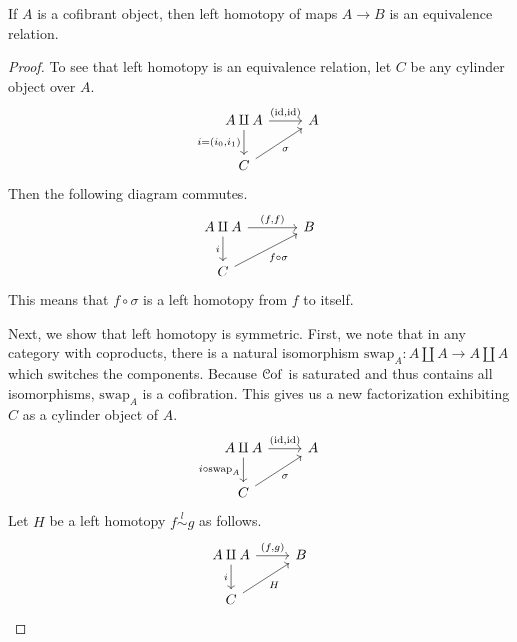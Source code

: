 \documentclass[main.tex]{subfiles}
\begin{document}
\begin{proposition}
  \label{prop:left_homotopy_is_equivalence_relation}
  If $A$ is a cofibrant object, then left homotopy of maps $A \to B$ is an equivalence relation.
\end{proposition}
\begin{proof}
  To see that left homotopy is an equivalence relation, let $C$ be any cylinder object over $A$.
  \begin{equation*}
    \begin{tikzcd}
      A \amalg A
      \arrow[r, "{(\id, \id)}"]
      \arrow[d, swap, "{i = (i_{0}, i_{1})}"]
      & A
      \\
      C
      \arrow[ur, swap, "\sigma"]
    \end{tikzcd}
  \end{equation*}
  Then the following diagram commutes.
  \begin{equation*}
    \begin{tikzcd}[column sep=large]
      A \amalg A
      \arrow[r, "{(f, f)}"]
      \arrow[d, swap, "i"]
      & B
      \\
      C
      \arrow[ur, swap, "f \circ \sigma"]
    \end{tikzcd}
  \end{equation*}
  This means that $f \circ \sigma$ is a left homotopy from $f$ to itself.

  Next, we show that left homotopy is symmetric. First, we note that in any category with coproducts, there is a natural isomorphism $\mathrm{swap}_{A}\colon A \amalg A \to A \amalg A$ which switches the components. Because $\mathcal{C}\mathrm{of}$ is saturated and thus contains all isomorphisms, $\mathrm{swap}_{A}$ is a cofibration. This gives us a new factorization exhibiting $C$ as a cylinder object of $A$.
  \begin{equation*}
    \begin{tikzcd}
      A \amalg A
      \arrow[r, "{(\id, \id)}"]
      \arrow[d, swap, "i \circ \mathrm{swap}_{A}"]
      & A
      \\
      C
      \arrow[ur, swap, "\sigma"]
    \end{tikzcd}
  \end{equation*}
  Let $H$ be a left homotopy $f \overset{l}{\sim} g$ as follows.
  \begin{equation*}
    \begin{tikzcd}
      A \amalg A
      \arrow[r, "{(f, g)}"]
      \arrow[d, swap, "i"]
      & B
      \\
      C
      \arrow[ur, swap, "H"]
    \end{tikzcd}
  \end{equation*}


\end{proof}
\end{document}
